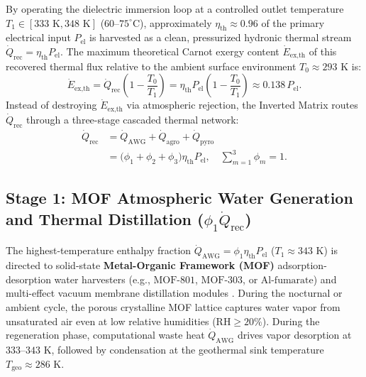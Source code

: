 \documentclass[aps,pre,twocolumn,10pt,superscriptaddress,amsmath,amssymb,amsfonts,floatfix,showkeys]{revtex4-2}
\begin{document}
By operating the dielectric immersion loop at a controlled outlet temperature $T_1 \in [333\text{ K}, 348\text{ K}]$ ($60\text{--}75^\circ\text{C}$), approximately $\eta_{\text{th}} \approx 0.96$ of the primary electrical input $P_{\text{el}}$ is harvested as a clean, pressurized hydronic thermal stream $\dot{Q}_{\text{rec}} = \eta_{\text{th}} P_{\text{el}}$. The maximum theoretical Carnot exergy content $\dot{E}_{\text{ex,th}}$ of this recovered thermal flux relative to the ambient surface environment $T_0 \approx 293\text{ K}$ is:
\begin{equation}
    \dot{E}_{\text{ex,th}} = \dot{Q}_{\text{rec}} \left( 1 - \frac{T_0}{T_1} \right) = \eta_{\text{th}} P_{\text{el}} \left( 1 - \frac{T_0}{T_1} \right) \approx 0.138 \, P_{\text{el}}.
    \label{eq:carnot_exergy}
\end{equation}
Instead of destroying $\dot{E}_{\text{ex,th}}$ via atmospheric rejection, the Inverted Matrix routes $\dot{Q}_{\text{rec}}$ through a three-stage cascaded thermal network:
\begin{equation}
\begin{aligned}
    \dot{Q}_{\text{rec}} &= \dot{Q}_{\text{AWG}} + \dot{Q}_{\text{agro}} + \dot{Q}_{\text{pyro}} \\
    &= \big(\phi_1 + \phi_2 + \phi_3\big)\eta_{\text{th}}P_{\text{el}}, \quad \sum_{m=1}^{3} \phi_m = 1.
\end{aligned}
\label{eq:thermal_partition}
\end{equation}

\subsection{Stage 1: MOF Atmospheric Water Generation and Thermal Distillation (\texorpdfstring{$\phi_1 \dot{Q}_{\text{rec}}$}{phi1 Qrec})}

The highest-temperature enthalpy fraction $\dot{Q}_{\text{AWG}} = \phi_1 \eta_{\text{th}} P_{\text{el}}$ ($T_1 \approx 343\text{ K}$) is directed to solid-state \textbf{Metal-Organic Framework (MOF)} adsorption-desorption water harvesters (e.g., $\text{MOF-801}$, $\text{MOF-303}$, or $\text{Al-fumarate}$) and multi-effect vacuum membrane distillation modules \cite{Kim2017MOF}. During the nocturnal or ambient cycle, the porous crystalline MOF lattice captures water vapor from unsaturated air even at low relative humidities ($\text{RH} \ge 20\%$). During the regeneration phase, computational waste heat $\dot{Q}_{\text{AWG}}$ drives vapor desorption at $333\text{--}343\text{ K}$, followed by condensation at the geothermal sink temperature $T_{\text{geo}} \approx 286\text{ K}$.
\end{document}
